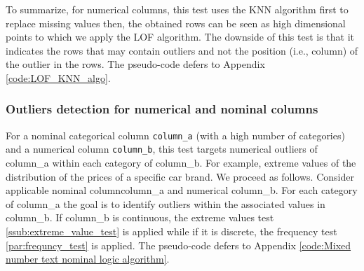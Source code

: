 \documentclass{article}
\begin{document}
To summarize, for numerical columns, this test uses the KNN algorithm first to replace missing values then, the obtained rows can be seen as high dimensional points to which we apply the LOF algorithm.
The downside of this test is that it indicates the rows that may contain outliers and not the position (i.e., column) of the outlier in the rows.
The pseudo-code defers to Appendix \ref{code:LOF_KNN_algo}.
\subsubsection{Outliers detection for numerical and nominal columns} %
\label{sub:Intra nominal extreme values}
For a nominal categorical column \texttt{column\_a} (with a high number of categories) and a numerical column \texttt{column\_b}, this test targets numerical outliers of {column\_a} within each category of {column\_b}.
For example, extreme values of the distribution of the prices of a specific car brand.
We proceed as follows.
Consider applicable nominal column{column\_a} and  numerical {column\_b}.
For each category of {column\_a} the goal is to identify outliers within the associated values in {column\_b}.
If {column\_b} is continuous, the extreme values test \ref{ssub:extreme_value_test} is applied while if it is discrete, the frequency test \ref{par:frequncy_test} is applied.
The pseudo-code defers to Appendix \ref{code:Mixed number text nominal logic algorithm}.
\end{document}
